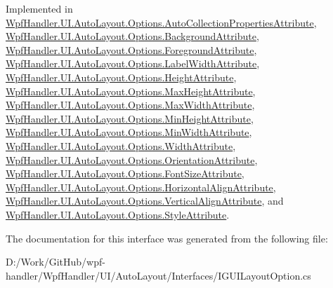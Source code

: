 Implemented in \mbox{\hyperlink{class_wpf_handler_1_1_u_i_1_1_auto_layout_1_1_options_1_1_auto_collection_properties_attribute_aaff2195c793c7e75ac553291d9189655}{Wpf\+Handler.\+U\+I.\+Auto\+Layout.\+Options.\+Auto\+Collection\+Properties\+Attribute}}, \mbox{\hyperlink{class_wpf_handler_1_1_u_i_1_1_auto_layout_1_1_options_1_1_background_attribute_a97cce29c9e19d9145e881c69e3bf3d4e}{Wpf\+Handler.\+U\+I.\+Auto\+Layout.\+Options.\+Background\+Attribute}}, \mbox{\hyperlink{class_wpf_handler_1_1_u_i_1_1_auto_layout_1_1_options_1_1_foreground_attribute_a5231ed2afb4d2d26eac9eab670adca45}{Wpf\+Handler.\+U\+I.\+Auto\+Layout.\+Options.\+Foreground\+Attribute}}, \mbox{\hyperlink{class_wpf_handler_1_1_u_i_1_1_auto_layout_1_1_options_1_1_label_width_attribute_ab8dae5f847875d310747599429c5054a}{Wpf\+Handler.\+U\+I.\+Auto\+Layout.\+Options.\+Label\+Width\+Attribute}}, \mbox{\hyperlink{class_wpf_handler_1_1_u_i_1_1_auto_layout_1_1_options_1_1_height_attribute_a221d69c339ceb5cd3e16d8e59f216cc9}{Wpf\+Handler.\+U\+I.\+Auto\+Layout.\+Options.\+Height\+Attribute}}, \mbox{\hyperlink{class_wpf_handler_1_1_u_i_1_1_auto_layout_1_1_options_1_1_max_height_attribute_a1b1d850c2c5d8e59454d7f9b5271ee88}{Wpf\+Handler.\+U\+I.\+Auto\+Layout.\+Options.\+Max\+Height\+Attribute}}, \mbox{\hyperlink{class_wpf_handler_1_1_u_i_1_1_auto_layout_1_1_options_1_1_max_width_attribute_ab7c7bf52114b1aa465f70debaeccf5f4}{Wpf\+Handler.\+U\+I.\+Auto\+Layout.\+Options.\+Max\+Width\+Attribute}}, \mbox{\hyperlink{class_wpf_handler_1_1_u_i_1_1_auto_layout_1_1_options_1_1_min_height_attribute_a8c049220211484fea64fbd1589a4cc57}{Wpf\+Handler.\+U\+I.\+Auto\+Layout.\+Options.\+Min\+Height\+Attribute}}, \mbox{\hyperlink{class_wpf_handler_1_1_u_i_1_1_auto_layout_1_1_options_1_1_min_width_attribute_a22bf72913c8d5d9f958d1edb1b52beda}{Wpf\+Handler.\+U\+I.\+Auto\+Layout.\+Options.\+Min\+Width\+Attribute}}, \mbox{\hyperlink{class_wpf_handler_1_1_u_i_1_1_auto_layout_1_1_options_1_1_width_attribute_afdff5891e40ae82fc6282d78753ff644}{Wpf\+Handler.\+U\+I.\+Auto\+Layout.\+Options.\+Width\+Attribute}}, \mbox{\hyperlink{class_wpf_handler_1_1_u_i_1_1_auto_layout_1_1_options_1_1_orientation_attribute_affc825395d69d510dfc17e37d330dfc8}{Wpf\+Handler.\+U\+I.\+Auto\+Layout.\+Options.\+Orientation\+Attribute}}, \mbox{\hyperlink{class_wpf_handler_1_1_u_i_1_1_auto_layout_1_1_options_1_1_font_size_attribute_abd93e70e5419e81c4dfdd9b5d1f35343}{Wpf\+Handler.\+U\+I.\+Auto\+Layout.\+Options.\+Font\+Size\+Attribute}}, \mbox{\hyperlink{class_wpf_handler_1_1_u_i_1_1_auto_layout_1_1_options_1_1_horizontal_align_attribute_a53335e3d47b8509f6ce67ad93044a760}{Wpf\+Handler.\+U\+I.\+Auto\+Layout.\+Options.\+Horizontal\+Align\+Attribute}}, \mbox{\hyperlink{class_wpf_handler_1_1_u_i_1_1_auto_layout_1_1_options_1_1_vertical_align_attribute_a5a37e0bcf32b49da94e4f4d539fe810c}{Wpf\+Handler.\+U\+I.\+Auto\+Layout.\+Options.\+Vertical\+Align\+Attribute}}, and \mbox{\hyperlink{class_wpf_handler_1_1_u_i_1_1_auto_layout_1_1_options_1_1_style_attribute_a4507ba7b9729b527b0c4f57bffaac0be}{Wpf\+Handler.\+U\+I.\+Auto\+Layout.\+Options.\+Style\+Attribute}}.



The documentation for this interface was generated from the following file\+:\begin{DoxyCompactItemize}
\item 
D\+:/\+Work/\+Git\+Hub/wpf-\/handler/\+Wpf\+Handler/\+U\+I/\+Auto\+Layout/\+Interfaces/I\+G\+U\+I\+Layout\+Option.\+cs\end{DoxyCompactItemize}

